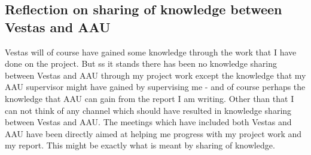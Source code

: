 \subsection{Reflection on sharing of knowledge between Vestas and AAU}
Vestas will of course have gained some knowledge through the work that I have done on the project. But ss it stands there has been no knowledge sharing between Vestas and AAU through my project work except the knowledge that my AAU supervisor might have gained by supervising me - and of course perhaps the knowledge that AAU can gain from the report I am writing. Other than that I can not think of any channel which should have resulted in knowledge sharing between Vestas and AAU. The meetings which have included both Vestas and AAU have been directly aimed at helping me progress with my project work and my report. This might be exactly what is meant by sharing of knowledge.
